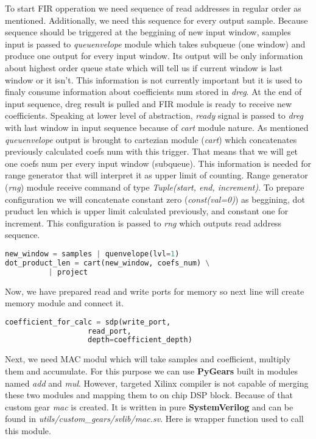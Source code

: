 \documentclass[a4paper, 12pt]{article}
\begin{document}
To start FIR opperation we need sequence of read addresses in regular order as mentioned. Additionally, we need this sequence for every output sample. Because sequence should be triggered at the beggining of new input window, samples input is passed to \textit{queuenvelope} module which takes subqueue (one window) and produce one output for every input window. Its output will be only information about highest order queue state which will tell us if current window is last window or it isn't. This information is not currently important but it is used to finaly consume information about coefficients num stored in \textit{dreg}. At the end of input sequence, dreg result is pulled and FIR module is ready to receive new coefficients. Speaking at lower level of abstraction, \textit{ready} signal is passed to \textit{dreg} with last window in input sequence because of \textit{cart} module nature.  As mentioned \textit{queuenvelope} output is brought to cartezian module (\textit{cart}) which concatenates previously calculated coefs num with this trigger. That means that we will get one coefs num per every input window (subqueue). This information is needed for range generator that will interpret it as upper limit of counting. Range generator (\textit{rng}) module receive command of type \textit{Tuple(start, end, increment)}. To prepare configuration we will concatenate constant zero (\textit{const(val=0)}) as beggining, dot pruduct len which is upper limit calculated previously, and constant one for increment. This configuration is passed to \textit{rng} which outputs read address sequence.

\begin{lstlisting}[language=Python, caption=Completing read port]
new_window = samples | quenvelope(lvl=1)
dot_product_len = cart(new_window, coefs_num) \
   		  | project
\end{lstlisting}

Now, we have prepared read and write ports for memory so next line will create memory module and connect it.

\begin{lstlisting}[language=Python, caption=Instance of SDP]
coefficient_for_calc = sdp(write_port, 
    			   read_port, 
    			   depth=coefficient_depth)
\end{lstlisting}

Next, we need MAC modul which will take samples and coefficient, multiply them and accumulate. For this purpose we can use \textbf{PyGears} built in modules named \textit{add} and \textit{mul}. However, targeted Xilinx compiler is not capable of merging these two modules and mapping them to on chip DSP block. Because of that custom gear \textit{mac} is created. It is written in pure \textbf{SystemVerilog} and can be found in \textit{utils/custom\_gears/svlib/mac.sv}. Here is wrapper function used to call this module.
\end{document}
